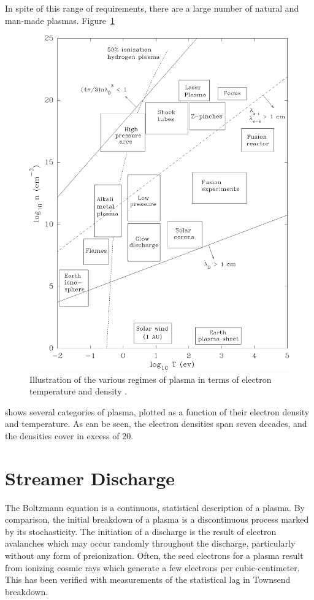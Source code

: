 In spite of this range of requirements, there are a large number of
natural and man-made plasmas. Figure~\ref{fig:regimes}
\begin{figure}
  \centering
  \includegraphics{./chapters/theory/figures/regimes.eps}
  \caption{Illustration of the various regimes of plasma in terms of
electron temperature and density \cite{Huba2011}.}
  \label{fig:regimes}
\end{figure}
shows several categories of plasma, plotted as a function of their
electron density and temperature. As can be seen, the electron densities
span seven decades, and the densities cover in excess of 20.

\section{Streamer Discharge}
The Boltzmann equation is a continuous, statistical description of a
plasma. By comparison, the initial breakdown of a plasma is a
discontinuous process marked by its stochasticity. The initiation of a
discharge is the result of electron avalanches which may occur randomly
throughout the discharge, particularly without any form of
preionization. Often, the seed electrons for a plasma result from
ionizing cosmic rays which generate a few electrons per
cubic-centimeter. This has been verified with measurements of the
statistical lag in Townsend breakdown.

